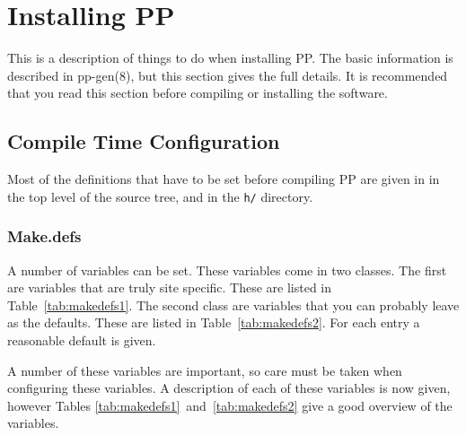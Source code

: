 \chapter {Installing PP}

This is a description of things to do when installing PP. The basic
information is described in \man pp-gen(8), but this section gives the
full details. It is recommended that you read this section before
compiling or installing the software.

\section {Compile Time Configuration}

Most of the definitions that have to be set before compiling PP are
given in  in the top level of the source tree, and
 in the \verb+h/+ directory.

\subsection {Make.defs}\label{Make.defs}

A number of  variables can be set. These variables come
in two classes. The first are variables that are truly site
specific. These are listed in Table~\ref{tab:makedefs1}. The second
class are variables that you can probably leave as the defaults.
These are listed in Table~\ref{tab:makedefs2}.  For each entry a
reasonable default is given.



A number of these variables are important, so care must be taken when
configuring these variables. A description of each of these variables
is now given, however Tables
\ref{tab:makedefs1}~and~\ref{tab:makedefs2} give a good overview of
the variables.

